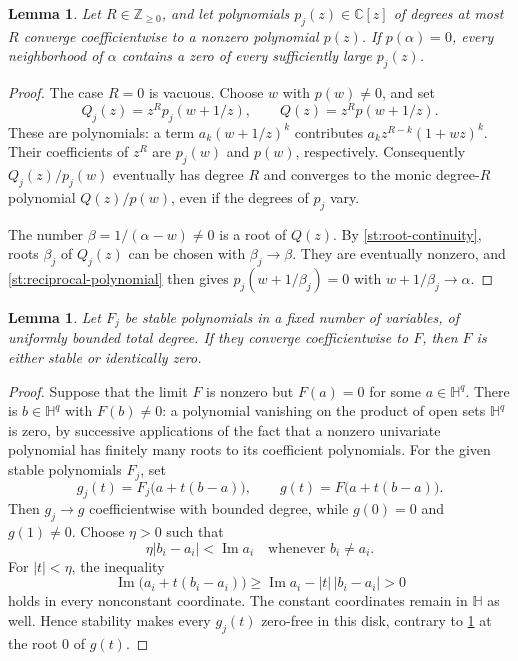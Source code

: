 \documentclass[reqno, 12pt]{article}
\numberwithin{equation}{section}
\newtheorem{lemma}[theorem]{Lemma}
\theoremstyle{definition}
\newcommand{\NN}{\mathbb Z_{\geq0}}
\newcommand{\CC}{\mathbb C}
\begin{document}
\begin{lemma}\label{st:root-persistence}
Let $R\in\NN$, and let polynomials $p_j(z)\in\CC[z]$ of degrees at most $R$ converge coefficientwise to a nonzero polynomial $p(z)$.
If $p(\alpha)=0$, every neighborhood of $\alpha$ contains a zero of every sufficiently large $p_j(z)$.
\end{lemma}
\begin{proof}
The case $R=0$ is vacuous.  Choose $w$ with $p(w)\ne0$, and set 
\begin{equation}\label{st:reciprocal-polynomial}
Q_j(z)=z^R p_j(w+1/z),\qquad Q(z)=z^R p(w+1/z).
\end{equation}
These are polynomials: a term $a_k(w+1/z)^k$ contributes $a_kz^{R-k}(1+wz)^k$.  Their coefficients of $z^R$ are $p_j(w)$ and $p(w)$, respectively.  Consequently $Q_j(z)/p_j(w)$ eventually has degree $R$ and converges to the monic degree-$R$ polynomial $Q(z)/p(w)$, even if the degrees of $p_j$ vary.

The number $\beta=1/(\alpha-w)\ne0$ is a root of $Q(z)$.
By \cref{st:root-continuity}, roots $\beta_j$ of $Q_j(z)$
can be chosen with $\beta_j\to\beta$.  They are eventually
nonzero, and \eqref{st:reciprocal-polynomial} then gives
$p_j(w+1/\beta_j)=0$ with $w+1/\beta_j\to\alpha$.
\end{proof}

\begin{lemma}\label{st:limit-closure}
Let $F_j$ be stable polynomials in a fixed number of variables, of
uniformly bounded total degree.  If they converge coefficientwise to
$F$, then $F$ is either stable or identically zero.
\end{lemma}
\begin{proof}
Suppose that the limit $F$ is nonzero but $F(a)=0$ for some
$a\in\mathbb H^q$.  There is $b\in\mathbb H^q$ with $F(b)\ne0$:
a polynomial vanishing on the product of open sets
$\mathbb H^q$ is zero, by successive applications of the
fact that a nonzero univariate polynomial has finitely many roots
to its coefficient polynomials.
For the given stable polynomials $F_j$, set
\[
g_j(t)=F_j\bigl(a+t(b-a)\bigr),\qquad
g(t)=F\bigl(a+t(b-a)\bigr).
\]
Then $g_j\to g$ coefficientwise with bounded degree, while
$g(0)=0$ and $g(1)\ne0$.  Choose $\eta>0$ such that
\[
\eta|b_i-a_i|<\operatorname{Im}a_i
\quad\text{whenever }b_i\ne a_i.
\]
For $|t|<\eta$, the inequality
\[
\operatorname{Im}\bigl(a_i+t(b_i-a_i)\bigr)
\geq\operatorname{Im}a_i-|t|\,|b_i-a_i|>0
\]
holds in every nonconstant coordinate.  The constant coordinates
remain in $\mathbb H$ as well.
Hence stability makes every $g_j(t)$ zero-free in this disk,
contrary to \cref{st:root-persistence} at the root $0$ of $g(t)$.
\end{proof}
\end{document}
